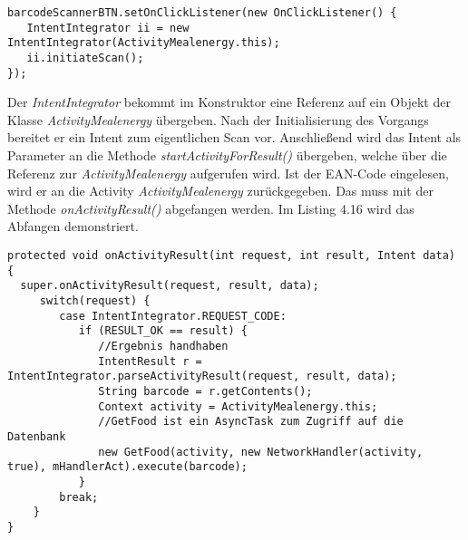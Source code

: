 \begin{lstlisting}[caption={Barcodesuche starten}]
barcodeScannerBTN.setOnClickListener(new OnClickListener() {
   IntentIntegrator ii = new IntentIntegrator(ActivityMealenergy.this);
   ii.initiateScan();
});
\end{lstlisting}

Der \emph{IntentIntegrator} bekommt im Konstruktor eine Referenz auf ein Objekt der 
Klasse \emph{ActivityMealenergy} \"ubergeben.
Nach der Initialisierung des Vorgangs bereitet er ein Intent zum eigentlichen Scan vor.
Anschlie\ss{}end wird das Intent als Parameter an die Methode \emph{startActivityForResult()} \"ubergeben,
welche \"uber die Referenz zur \emph{ActivityMealenergy} aufgerufen wird.
Ist der EAN-Code eingelesen, wird er an die Activity \emph{ActivityMealenergy} zur\"uckgegeben.
Das muss mit der Methode \emph{onActivityResult()} abgefangen werden.
Im Listing 4.16 wird das Abfangen demonstriert.\\

\begin{lstlisting}[caption={Ergebnis der Suche abfangen}]
protected void onActivityResult(int request, int result, Intent data) {
  super.onActivityResult(request, result, data);  
     switch(request) {
        case IntentIntegrator.REQUEST_CODE:
           if (RESULT_OK == result) {     
              //Ergebnis handhaben
              IntentResult r = IntentIntegrator.parseActivityResult(request, result, data);              
              String barcode = r.getContents();              
              Context activity = ActivityMealenergy.this;
              //GetFood ist ein AsyncTask zum Zugriff auf die Datenbank
              new GetFood(activity, new NetworkHandler(activity, true), mHandlerAct).execute(barcode);
           }
        break;
    }
}
\end{lstlisting}